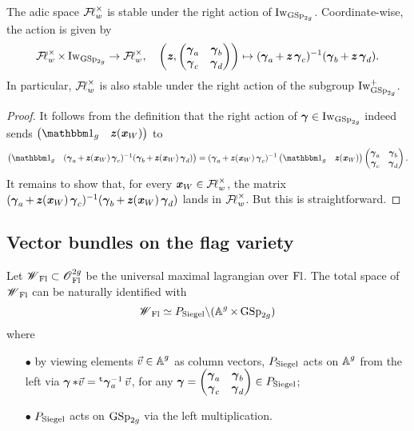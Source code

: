 \begin{Lemma}\label{Lemma: Iw_GSp stabilises FL_w^times}
The adic space $\adicFL_w^\times$ is stable under the right action of $\Iw_{\GSp_{2g}}$. Coordinate-wise, the action is given by $$\adicFL_w^{\times}\times \Iw_{\GSp_{2g}}\rightarrow \adicFL_w^{\times}, \quad \left(\bfitz,\begin{pmatrix}\bfgamma_a & \bfgamma_b\\ \bfgamma_c & \bfgamma_d\end{pmatrix} \right)\mapsto (\bfgamma_a+\bfitz\bfgamma_c)^{-1} (\bfgamma_b+\bfitz\bfgamma_d).$$
In particular, $\adicFL_w^{\times}$ is also stable under the right action of the subgroup $\Iw_{\GSp_{2g}}^+$.
\end{Lemma}
\begin{proof}
It follows from the definition that the right action of $\bfgamma\in\Iw_{\GSp_{2g}}$ indeed sends $\begin{pmatrix}\one_g & \bfitz(\bfitx_W)\end{pmatrix}$ to 
$$\begin{pmatrix}\one_g &  (\bfgamma_a+\bfitz(\bfitx_W)\bfgamma_c)^{-1} (\bfgamma_b+\bfitz(\bfitx_W)\bfgamma_d)\end{pmatrix} =(\bfgamma_a+\bfitz(\bfitx_W)\bfgamma_c)^{-1} \begin{pmatrix}\one_g & \bfitz(\bfitx_W)\end{pmatrix} \begin{pmatrix}\bfgamma_a & \bfgamma_b\\ \bfgamma_c & \bfgamma_d\end{pmatrix}.$$
It remains to show that, for every $\bfitx_W\in \adicFL^{\times}_w$, the matrix $(\bfgamma_a+\bfitz(\bfitx_W)\bfgamma_c)^{-1} (\bfgamma_b+\bfitz(\bfitx_W)\bfgamma_d)$ lands in $\adicFL^{\times}_w$. But this is straightforward.
\end{proof}


\subsection{Vector bundles on the flag variety}\label{subsection: vector bundles on the flag variety}
Let $\scrW_{\Fl}\subset\scrO_{\Fl}^{2g}$ be the universal maximal lagrangian over $\Fl$. The total space of $\scrW_{\Fl}$ can be naturally identified with $$\scrW_{\Fl}\simeq P_{\Siegel}\backslash (\bbA^g\times \GSp_{2g})$$ where \begin{enumerate}
    \item[$\bullet$] by viewing elements $\vec{v}\in \bbA^g$ as column vectors, $P_{\Siegel}$ acts on $\bbA^g$ from the left via $ \bfgamma * \vec{v}  = \trans\bfgamma_a^{-1}\vec{v}$, for any $\bfgamma=\begin{pmatrix}\bfgamma_a & \bfgamma_b\\ \bfgamma_c & \bfgamma_d\end{pmatrix}\in P_{\Siegel}$;
    \item[$\bullet$] $P_{\Siegel}$ acts on $\GSp_{2g}$ via the left multiplication. 
\end{enumerate} 

